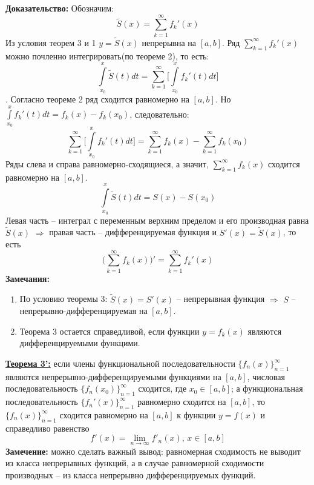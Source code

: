 \documentclass[a4paper,12pt]{article} %
\begin{document}
\textbf{Доказательство:}
Обозначим: $$\widetilde{S}(x)= \sum\limits_{k = 1}^{\infty}  f_k'(x)$$
Из условия теорем 3 и 1 $y = \widetilde{S}(x)$ непрерывна на $[a,b]$.
Ряд $\sum\limits_{k = 1}^{\infty}  f_k'(x)$ можно почленно интегрировать(по теореме 2), то есть:
$$\int\limits_{x_0}^x \widetilde{S}(t)dt = \sum\limits_{k = 1}^{\infty}  \big[\int\limits_{x_0}^{x}f_k'(t)dt\big]$$. \newline
Согласно теореме 2 ряд сходится равномерно на $[a,b]$. 
Но $\int\limits_{x_0}^{x}f_k'(t)dt = f_k(x)-f_k(x_0)$, следовательно: $$\sum\limits_{k = 1}^{\infty}  \big[\int\limits_{x_0}^{x}f_k'(t)dt\big] = \sum\limits_{k=1}^\infty f_k(x)-\sum\limits_{k=1}^\infty f_k(x_0)$$
Ряды слева и справа равномерно-сходящиеся, а значит, $\sum\limits_{k=1}^\infty f_k(x)$ сходится равномерно на $[a,b]$.
$$\int\limits_{x_0}^x \widetilde{S}(t)dt = S(x)-S(x_0)$$
Левая часть -- интеграл с переменным верхним пределом и его производная равна $\widetilde{S}(x)$ $\Rightarrow$ правая часть -- дифференцируемая функция и $S'(x) = \widetilde{S}(x)$, то есть 
$$\bigg(\sum\limits_{k = 1}^{\infty}  f_k(x)\bigg)' = \sum\limits_{k = 1}^{\infty}  f_k'(x)$$
\noindent \textbf{Замечания:}
\begin{enumerate}
\item По условию теоремы 3: $\widetilde{S}(x) = S'(x)$ -- непрерывная функция $\Rightarrow$ $S$ -- непрерывно-дифференцируемая на $[a,b]$.

\item Теорема 3 остается справедливой, если функции $y=f_k(x)$ являются дифференцируемыми функцими.\\
\end{enumerate}
\underline{\textbf{Теорема 3':}} если члены функциональной последовательности $\{f_n(x)\}_{n=1}^\infty$ являются непрерывно-дифференцируемыми функциями на $[a,b]$, числовая последовательность $\{f_n(x_0)\}_{n=1}^\infty$ сходится, где $x_0 \in [a,b]$; а функциональная последовательность $\{f_n'(x)\}_{n=1}^\infty$ равномерно сходится на $[a,b]$, то $\{f_n(x)\}_{n=1}^\infty$ сходится равномерно на $[a,b]$ к функции $y = f(x)$ и справедливо равенство $$f'(x)= \lim\limits_{n\rightarrow \infty} f'_n(x) \text{, }x \in [a,b]$$
\textbf{Замечение:} можно сделать важный вывод: равномерная сходимость не выводит из класса непрерывных функций, а в случае равномерной сходимости производных -- из класса непрерывно дифференцируемых функций.
\end{document}

